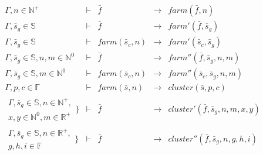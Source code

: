 \documentclass{article}
\begin{document}
\[
  \begin{array}{rclcl}
    \Gamma, n \in \mathbb{N}^{+} & \vdash & \bar{f} & \rightarrow & farm(\bar{f}, n) \\
    \Gamma, \bar{s}_{g} \in \mathbb{S} & \vdash & \bar{f} & \rightarrow & farm'(\bar{f}, \bar{s}_{g}) \\
    \Gamma, \bar{s}_{g} \in \mathbb{S} & \vdash & farm(\bar{s}_c, n) & \rightarrow & farm'(\bar{s}_c, \bar{s}_{g}) \\
    \Gamma, \bar{s}_{g} \in \mathbb{S}, n,m \in \mathbb{N}^{0} & \vdash & \bar{f} & \rightarrow & farm''(\bar{f}, \bar{s}_{g}, n, m) \\
    \Gamma, \bar{s}_{g} \in \mathbb{S}, m \in \mathbb{N}^{0} & \vdash &
                                                                        farm(\bar{s}_c, n) & \rightarrow & farm''(\bar{s}_c, \bar{s}_{g}, n, m) \\
    \Gamma, p,c \in \mathbb{F} & \vdash & farm(\bar{s}, n) & \rightarrow & cluster(\bar{s}, p, c) \\
    \begin{array}{r}
      \Gamma, \bar{s}_{g} \in \mathbb{S}, n \in \mathbb{N}^{+}, \\
      x,y \in \mathbb{N}^{0}, m \in \mathbb{R}^{+} 
    \end{array} \bigg\} & \vdash & \bar{f} & \rightarrow & cluster'(\bar{f}, \bar{s}_g, n, m, x, y) \\
    \begin{array}{r} 
      \Gamma, \bar{s}_{g} \in \mathbb{S}, n \in \mathbb{R}^{+}, \\
      g,h,i \in \mathbb{F}
    \end{array} \Bigg\} & \vdash & \bar{f} & \rightarrow & cluster''(\bar{f}, \bar{s}_g, n, g, h, i) \\
  \end{array}
\]
\end{document}
